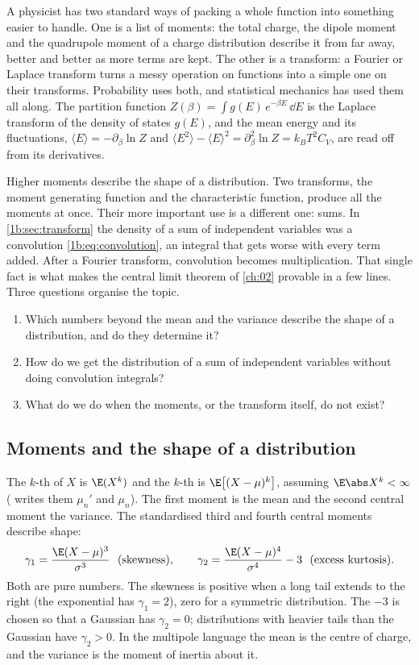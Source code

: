 A physicist has two standard ways of packing a whole function into
something easier to handle. One is a list of moments: the total charge, the
dipole moment and the quadrupole moment of a charge distribution describe it
from far away, better and better as more terms are kept. The other is a
transform: a Fourier or Laplace transform turns a messy operation on
functions into a simple one on their transforms. Probability uses both, and
statistical mechanics has used them all along. The partition function
$Z(\beta)=\int g(E)\,e^{-\beta E}\,\dd E$ is the Laplace transform of the
density of states $g(E)$, and the mean energy and its fluctuations,
$\langle E\rangle=-\partial_\beta\ln Z$ and
$\langle E^2\rangle-\langle E\rangle^2=\partial_\beta^2\ln Z=k_BT^2C_V$, are
read off from its derivatives.

Higher moments describe the shape of a distribution. Two transforms, the
moment generating function and the characteristic function, produce all the
moments at once. Their more important use is a different one: sums. In
\cref{1b:sec:transform} the density of a sum of independent variables was a
convolution \eqref{1b:eq:convolution}, an integral that gets worse with every
term added. After a Fourier transform, convolution becomes multiplication.
That single fact is what makes the central limit theorem of \cref{ch:02}
provable in a few lines. Three questions organise the topic.
\begin{enumerate}[leftmargin=1.6em,itemsep=1pt]
  \item Which numbers beyond the mean and the variance describe the shape of a
        distribution, and do they determine it?
  \item How do we get the distribution of a sum of independent variables
        without doing convolution integrals?
  \item What do we do when the moments, or the transform itself, do not exist?
\end{enumerate}

\subsection{Moments and the shape of a distribution}

The $k$-th  of $X$ is $\E(X^k)$ and the $k$-th
 is $\E\bigl[(X-\mu)^k\bigr]$, assuming
$\E\abs X^k<\infty$  ( writes
them $\mu_n'$ and $\mu_n$). The first moment is the mean and the second
central moment the variance. The standardised third and fourth central
moments describe shape:
\begin{equation}
  \gamma_1=\frac{\E(X-\mu)^3}{\sigma^3}\ \ \text{(skewness)},\qquad
  \gamma_2=\frac{\E(X-\mu)^4}{\sigma^4}-3\ \ \text{(excess kurtosis)} .
  \label{1b:eq:skew-kurt}
\end{equation}
Both are pure numbers. The skewness is positive when a long tail extends to
the right (the exponential has $\gamma_1=2$), zero for a symmetric
distribution. The $-3$ is chosen so that a Gaussian has $\gamma_2=0$;
distributions with heavier tails than the Gaussian have $\gamma_2>0$. In the
multipole language the mean is the centre of charge, and the variance is the
moment of inertia about it.

